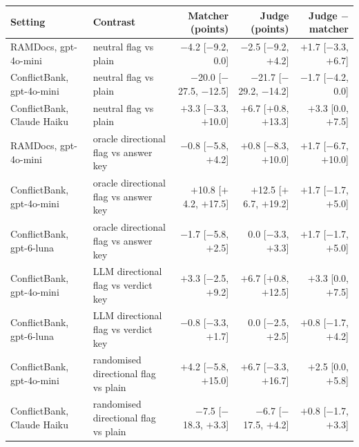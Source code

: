 \begin{table}[t]
\centering\scriptsize
\setlength{\tabcolsep}{4pt}
\begin{tabular}{llrrr}
\toprule
Setting & Contrast & Matcher (points) & Judge (points) & Judge $-$ matcher \\
\midrule
RAMDocs, gpt-4o-mini & neutral flag vs plain & $-$4.2 [$-$9.2, 0.0] & $-$2.5 [$-$9.2, $+$4.2] & $+$1.7 [$-$3.3, $+$6.7] \\
ConflictBank, gpt-4o-mini & neutral flag vs plain & $-$20.0 [$-$27.5, $-$12.5] & $-$21.7 [$-$29.2, $-$14.2] & $-$1.7 [$-$4.2, 0.0] \\
ConflictBank, Claude Haiku & neutral flag vs plain & $+$3.3 [$-$3.3, $+$10.0] & $+$6.7 [$+$0.8, $+$13.3] & $+$3.3 [0.0, $+$7.5] \\
RAMDocs, gpt-4o-mini & oracle directional flag vs answer key & $-$0.8 [$-$5.8, $+$4.2] & $+$0.8 [$-$8.3, $+$10.0] & $+$1.7 [$-$6.7, $+$10.0] \\
ConflictBank, gpt-4o-mini & oracle directional flag vs answer key & $+$10.8 [$+$4.2, $+$17.5] & $+$12.5 [$+$6.7, $+$19.2] & $+$1.7 [$-$1.7, $+$5.0] \\
ConflictBank, gpt-6-luna & oracle directional flag vs answer key & $-$1.7 [$-$5.8, $+$2.5] & 0.0 [$-$3.3, $+$3.3] & $+$1.7 [$-$1.7, $+$5.0] \\
ConflictBank, gpt-4o-mini & LLM directional flag vs verdict key & $+$3.3 [$-$2.5, $+$9.2] & $+$6.7 [$+$0.8, $+$12.5] & $+$3.3 [0.0, $+$7.5] \\
ConflictBank, gpt-6-luna & LLM directional flag vs verdict key & $-$0.8 [$-$3.3, $+$1.7] & 0.0 [$-$2.5, $+$2.5] & $+$0.8 [$-$1.7, $+$4.2] \\
ConflictBank, gpt-4o-mini & randomised directional flag vs plain & $+$4.2 [$-$5.8, $+$15.0] & $+$6.7 [$-$3.3, $+$16.7] & $+$2.5 [0.0, $+$5.8] \\
ConflictBank, Claude Haiku & randomised directional flag vs plain & $-$7.5 [$-$18.3, $+$3.3] & $-$6.7 [$-$17.5, $+$4.2] & $+$0.8 [$-$1.7, $+$3.3] \\
\bottomrule
\end{tabular}


\end{table}
